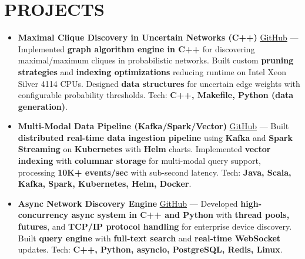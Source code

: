 \documentclass[letterpaper,10pt]{article}
\newcommand{\resumeItem}[1]{\item\small #1}
\begin{document}
\section{\textcolor{metablue}{PROJECTS}}
\vspace{-5pt}
\begin{tcolorbox}[colback=white,colframe=metablue,boxrule=0.8pt,arc=2pt,left=4pt,right=4pt,top=2pt,bottom=2pt]
\begin{itemize}
\resumeItem{\textbf{Maximal Clique Discovery in Uncertain Networks (C++)} \href{https://github.com/adityasugandhi/Improved-Algorithms-in-finding-maximal-and-maximum-clique-in-uncertain-networks}{GitHub} --- Implemented \textbf{graph algorithm engine in C++} for discovering maximal/maximum cliques in probabilistic networks. Built custom \textbf{pruning strategies} and \textbf{indexing optimizations} reducing runtime on Intel Xeon Silver 4114 CPUs. Designed \textbf{data structures} for uncertain edge weights with configurable probability thresholds. Tech: \textbf{C++, Makefile, Python (data generation)}.}
\resumeItem{\textbf{Multi-Modal Data Pipeline (Kafka/Spark/Vector)} \href{https://github.com/adityasugandhi}{GitHub} --- Built \textbf{distributed real-time data ingestion pipeline} using \textbf{Kafka} and \textbf{Spark Streaming} on \textbf{Kubernetes} with \textbf{Helm} charts. Implemented \textbf{vector indexing} with \textbf{columnar storage} for multi-modal query support, processing \textbf{10K+ events/sec} with sub-second latency. Tech: \textbf{Java, Scala, Kafka, Spark, Kubernetes, Helm, Docker}.}
\resumeItem{\textbf{Async Network Discovery Engine} \href{https://github.com/adityasugandhi}{GitHub} --- Developed \textbf{high-concurrency async system in C++ and Python} with \textbf{thread pools, futures}, and \textbf{TCP/IP protocol handling} for enterprise device discovery. Built \textbf{query engine} with \textbf{full-text search} and \textbf{real-time WebSocket} updates. Tech: \textbf{C++, Python, asyncio, PostgreSQL, Redis, Linux}.}
\end{itemize}
\end{tcolorbox}
\vspace{-5pt}


\end{document}
